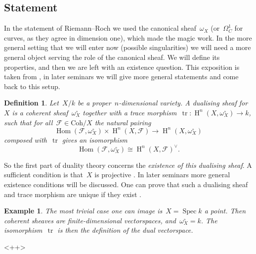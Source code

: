 \documentclass[10pt,a4paper]{article}
\theoremstyle{lecture}
\newtheorem{definition}[theorem]{Definition}
\newtheorem{example}[theorem]{Example}
\newcommand\dash{\nobreakdash-\hspace{0pt}}
\newcommand\Coh{\ensuremath{\mathrm{Coh}}}
\DeclareMathOperator\HH{H}
\DeclareMathOperator\Hom{Hom}
\DeclareMathOperator\tr{tr}
\DeclareMathOperator\Spec{Spec}
\begin{document}
\subsection{Statement}
\label{subsection:serre-duality-statement}
In the statement of Riemann--Roch we used the canonical sheaf~$\omega_X$ (or~$\Omega_C^1$ for curves, as they agree in dimension one), which made the magic work. In the more general setting that we will enter now (possible singularities) we will need a more general object serving the role of the canonical sheaf. We will define its properties, and then we are left with an existence question. This exposition is taken from \cite[\S III.7]{hartshorne-algebraic-geometry}, in later seminars we will give more general statements and come back to this setup.
\begin{definition}
  Let~$X/k$ be a proper~$n$\dash dimensional variety. A \emph{dualising sheaf} for~$X$ is a coherent sheaf~$\omega_X^\circ$ together with a \emph{trace morphism}~$\tr\colon\HH^n(X,\omega_X^\circ)\to k$, such that for all~$\mathcal{F}\in\Coh/X$ the natural pairing
  \begin{equation}
    \Hom(\mathcal{F},\omega_X^\circ)\times\HH^n(X,\mathcal{F})\to\HH^n(X,\omega_X^\circ)
  \end{equation}
  composed with~$\tr$ gives an isomorphism
  \begin{equation}
    \Hom(\mathcal{F},\omega_X^\circ)\cong\HH^n(X,\mathcal{F})^\vee.
  \end{equation}
\end{definition}
So the first part of duality theory concerns the \emph{existence of this dualising sheaf}. A sufficient condition is that~$X$ is projective \cite[proposition III.7.5]{hartshorne-algebraic-geometry}. In later seminars more general existence conditions will be discussed. One can prove that such a dualising sheaf and trace morphism are unique if they exist \cite[proposition III.7.2]{hartshorne-algebraic-geometry}.

\begin{example}
  The most trivial case one can image is~$X=\Spec k$ a point. Then coherent sheaves are finite-dimensional vectorspaces, and~$\omega_X^\circ=k$. The isomorphism~$\tr$ is then the definition of the dual vectorspace.
\end{example}<++>
\end{document}
